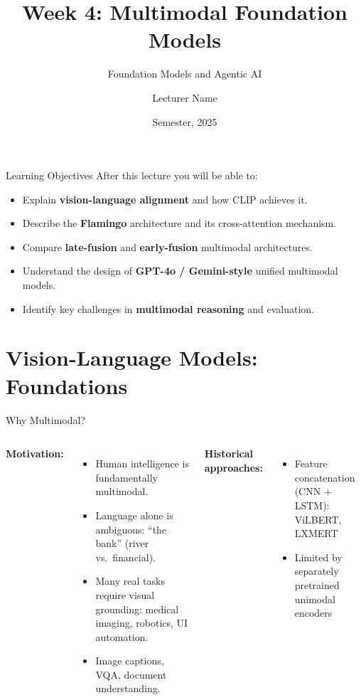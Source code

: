 \documentclass[aspectratio=169,10pt]{beamer}
\title{Week 4: Multimodal Foundation Models}
\subtitle{Foundation Models and Agentic AI}
\author{Lecturer Name}
\institute{Holon Institute of Technology (HIT)}
\date{Semester, 2025}
\begin{document}
\begin{frame}
  \titlepage
\end{frame}

\begin{frame}{Learning Objectives}
  After this lecture you will be able to:
  \begin{itemize}
    \item Explain \textbf{vision-language alignment} and how CLIP achieves it.
    \item Describe the \textbf{Flamingo} architecture and its cross-attention mechanism.
    \item Compare \textbf{late-fusion} and \textbf{early-fusion} multimodal architectures.
    \item Understand the design of \textbf{GPT-4o / Gemini-style} unified multimodal models.
    \item Identify key challenges in \textbf{multimodal reasoning} and evaluation.
  \end{itemize}
\end{frame}

\section{Vision-Language Models: Foundations}

\begin{frame}{Why Multimodal?}
  \begin{columns}[T]
      \textbf{Motivation:}
      \begin{itemize}
        \item Human intelligence is fundamentally multimodal.
        \item Language alone is ambiguous: ``the bank'' (river vs.\ financial).
        \item Many real tasks require visual grounding: medical imaging, robotics, UI automation.
        \item Image captions, VQA, document understanding.
      \end{itemize}
      \vspace{0.4em}
      \textbf{Historical approaches:}
      \begin{itemize}
        \item Feature concatenation (CNN + LSTM): ViLBERT, LXMERT
        \item Limited by separately pretrained unimodal encoders
      \end{itemize}
  \end{columns}
\end{frame}
\end{document}
